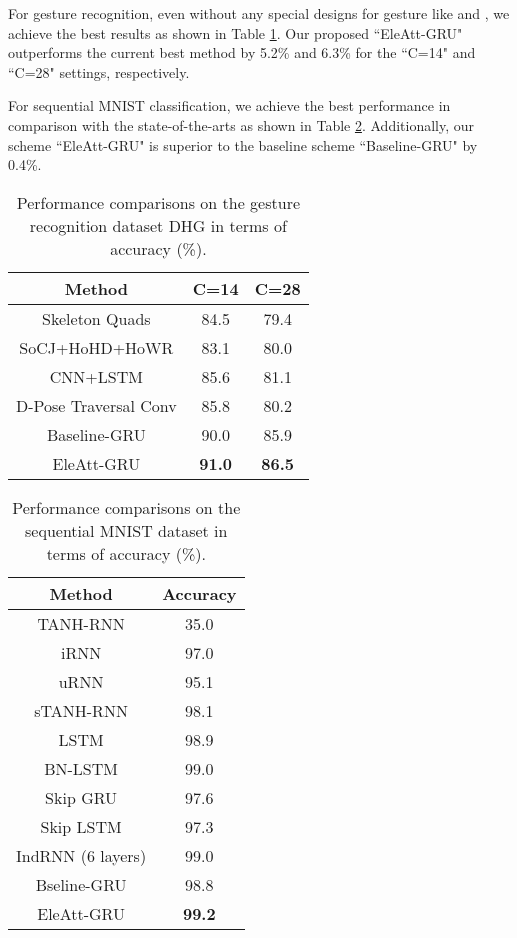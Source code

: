 \documentclass[journal]{IEEEtran}
\begin{document}
For gesture recognition, even without any special designs for gesture like \cite{nunez2018convolutional} and \cite{weng2018deformable}, we achieve the best results as shown in Table \ref{tab:DHG}. Our proposed ``EleAtt-GRU" outperforms the current best method by 5.2\% and 6.3\% for the ``C=14" and ``C=28" settings, respectively. 

For sequential MNIST classification, we achieve the best performance in comparison with the state-of-the-arts as shown in Table \ref{tab:MNIST}. Additionally, our scheme ``EleAtt-GRU" is superior to the baseline scheme ``Baseline-GRU" by 0.4\%.





\setlength{\tabcolsep}{7pt}
\begin{table}[!]
	\centering
	\caption{Performance comparisons on the gesture recognition dataset DHG in terms of accuracy (\%).}
	\begin{tabular}{ccc}
		\toprule
		Method & C=14  & C=28 \\
		\midrule
		Skeleton Quads \cite{evangelidis2014skeletal} & 84.5  & 79.4  \\
		SoCJ+HoHD+HoWR \cite{de2016skeleton} & 83.1  & 80.0  \\
		CNN+LSTM \cite{nunez2018convolutional} & 85.6  & 81.1  \\
		D-Pose Traversal Conv \cite{weng2018deformable} & 85.8  & 80.2  \\
		\midrule
		Baseline-GRU & 90.0  & 85.9  \\
		EleAtt-GRU & \textbf{91.0}  & \textbf{86.5}  \\
		\bottomrule
	\end{tabular}\label{tab:DHG}\end{table}\setlength{\tabcolsep}{7pt}
\begin{table}[t]\centering
	\caption{Performance comparisons on the sequential MNIST dataset in terms of accuracy (\%).}
	\begin{tabular}{cc}
		\toprule
		Method & Accuracy \\
		\midrule
		TANH-RNN \cite{le2015simple} & 35.0  \\
		iRNN \cite{le2015simple}  & 97.0  \\
		uRNN \cite{arjovsky2016unitary}  & 95.1  \\
		sTANH-RNN \cite{zhang2016architectural}& 98.1  \\
		LSTM \cite{cooijmans2016recurrent}  & 98.9  \\
		BN-LSTM \cite{cooijmans2016recurrent}& 99.0  \\
		Skip GRU \cite{campos2018skip}& 97.6  \\
		Skip LSTM \cite{campos2018skip}& 97.3  \\
		IndRNN (6 layers) \cite{li2018independently} & 99.0  \\
		\midrule
		Bseline-GRU & 98.8  \\
		EleAtt-GRU & \textbf{99.2}  \\
		\bottomrule
	\end{tabular}\label{tab:MNIST}\end{table}
\end{document}
